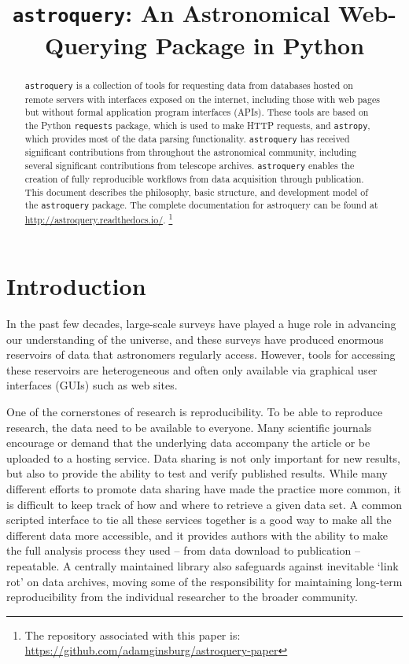 \documentclass[twocolumn]{aastex62}
\newcommand{\package}[1]{\texttt{#1}\xspace}
\newcommand{\astroquery}{\package{astroquery}}
\newcommand{\astropypkg}{\package{astropy}}
\begin{document}


\title{\astroquery: An Astronomical Web-Querying Package in Python}

\begin{abstract}
\astroquery is a collection of tools for requesting data from databases hosted
on remote servers with interfaces exposed on the internet, including those with
web pages but without formal application program interfaces (APIs).  These
tools are based on the Python
\package{requests} package, which is used to make HTTP requests, and
\astropypkg, which provides most of the data parsing functionality. \astroquery
has received significant contributions from throughout the astronomical community,
including several significant contributions from telescope archives.
\astroquery enables the creation of fully reproducible workflows from data
acquisition through publication.  This document describes the philosophy, basic
structure, and development model of the \astroquery package.
The complete documentation for astroquery can be found at
\url{http://astroquery.readthedocs.io/}.
\footnote{%
The repository associated with this paper is:\\
\url{https://github.com/adamginsburg/astroquery-paper}
}
\end{abstract}


\section{Introduction}
In the past few decades, large-scale surveys have played a huge role in
advancing our understanding of the universe, and these surveys have produced
enormous reservoirs of data that astronomers regularly access.  However, tools
for accessing these reservoirs are heterogeneous and often only available via
graphical user interfaces (GUIs) such as web sites.

One of the cornerstones of research is reproducibility. To be able to reproduce
research, the data need to be available to everyone. Many scientific journals
encourage or demand that the underlying data  accompany the article or be
uploaded to a hosting service. Data sharing is not only important for new
results, but also to provide the ability to test and verify published results.
While many different efforts to promote data sharing have made the practice
more common, it is difficult to keep track of how and where to retrieve a given
data set. A common scripted interface to tie all these services together is a
good way to make all the different data more accessible, and it provides
authors with the ability to make the full analysis process they used -- from
data download to publication -- repeatable.  A centrally maintained library
also safeguards against inevitable `link rot' on data archives, moving some of
the responsibility for maintaining long-term reproducibility from the
individual researcher to the broader community.
\end{document}
